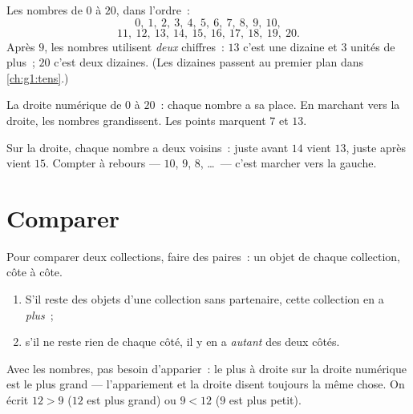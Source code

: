 \begin{example}\label{ex:g1:counting:writing}
Les nombres de $0$ à $20$, dans l'ordre~:
\[
0,\ 1,\ 2,\ 3,\ 4,\ 5,\ 6,\ 7,\ 8,\ 9,\ 10,
\]
\[
11,\ 12,\ 13,\ 14,\ 15,\ 16,\ 17,\ 18,\ 19,\ 20 .
\]
Après $9$, les nombres utilisent \emph{deux} chiffres~: $13$ c'est
une dizaine et $3$ unités de plus~; $20$ c'est deux dizaines. (Les
dizaines passent au premier plan dans
\cref{ch:g1:tens}.)
\end{example}

\begin{omfigure}

{\small La droite numérique de $0$ à $20$~: chaque nombre a sa place.
En marchant vers la droite, les nombres grandissent. Les points marquent
$7$ et $13$.}
\end{omfigure}

\begin{example}\label{ex:g1:counting:neighbors}
Sur la droite, chaque nombre a deux voisins~: juste avant $14$ vient
$13$, juste après vient $15$. Compter à rebours --- $10$, $9$, $8$,
\dots\ --- c'est marcher vers la gauche.
\end{example}

\section{Comparer}

\begin{method}\label{met:g1:counting:compare}
Pour comparer deux collections, faire des paires~: un objet de chaque
collection, côte à côte.
\begin{enumerate}
  \item S'il reste des objets d'une collection sans partenaire, cette
        collection en a \emph{plus}~;
  \item s'il ne reste rien de chaque côté, il y en a
        \emph{autant} des deux côtés.
\end{enumerate}
Avec les nombres, pas besoin d'apparier~: le plus à droite sur la
droite numérique est le plus grand --- l'appariement et la droite
disent toujours la même chose. On écrit $12 > 9$ ($12$ est plus
grand) ou $9 < 12$ ($9$ est plus petit).
\end{method}

